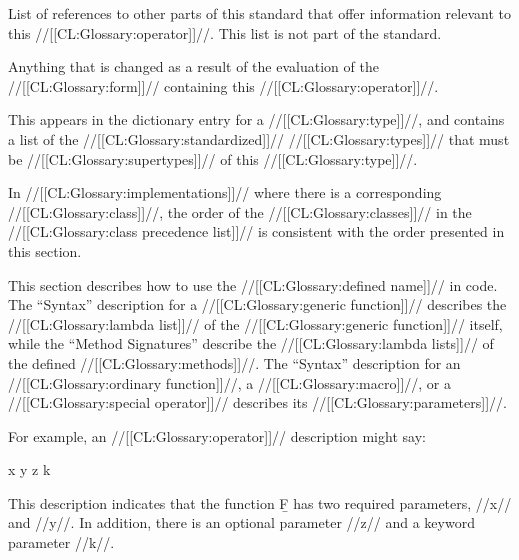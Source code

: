 
List of references to other parts of this standard
that offer information relevant to this //[[CL:Glossary:operator]]//. 
This list is not part of the standard.
         
\endsubsubsection%


Anything that is changed as a result of the
evaluation of the //[[CL:Glossary:form]]// containing this //[[CL:Glossary:operator]]//.

\endsubsubsection%


This appears in the dictionary entry for a //[[CL:Glossary:type]]//,
and contains a list of the //[[CL:Glossary:standardized]]// //[[CL:Glossary:types]]// 
that must be //[[CL:Glossary:supertypes]]// of this //[[CL:Glossary:type]]//.



In //[[CL:Glossary:implementations]]// where there is a corresponding //[[CL:Glossary:class]]//,
the order of the //[[CL:Glossary:classes]]// in the //[[CL:Glossary:class precedence list]]// 
is consistent with the order presented in this section.

\endsubsubsection%


This section describes how to use the //[[CL:Glossary:defined name]]// in code.
The ``Syntax'' description for a //[[CL:Glossary:generic function]]// 
describes the //[[CL:Glossary:lambda list]]// of the //[[CL:Glossary:generic function]]// itself, 
while the ``Method Signatures'' describe the //[[CL:Glossary:lambda lists]]// 
of the defined //[[CL:Glossary:methods]]//.
The ``Syntax'' description for 
     an //[[CL:Glossary:ordinary function]]//,
     a //[[CL:Glossary:macro]]//,
  or a //[[CL:Glossary:special operator]]//
describes its //[[CL:Glossary:parameters]]//.

For example, an //[[CL:Glossary:operator]]// description might say:

 {x y {\opt} z {\key} k}

\noindent This description indicates that the function \b{F} 
has two required parameters, //x// and //y//.  In addition,
there is an optional parameter //z// and a keyword parameter //k//.

